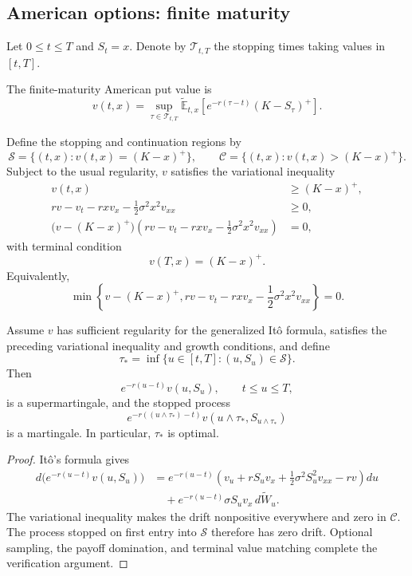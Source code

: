 \subsection{American options: finite maturity}

Let $0\leq t\leq T$ and $S_t=x$. Denote by $\mathcal{T}_{t,T}$ the stopping times taking values in $[t,T]$.

\begin{de}
The finite-maturity American put value is
\[
v(t,x)
=\sup_{\tau\in\mathcal{T}_{t,T}}
 \widetilde{\mathbb{E}}_{t,x}
 \left[e^{-r(\tau-t)}(K-S_\tau)^+\right].
\]
\end{de}

Define the stopping and continuation regions by
\[
\mathcal{S}
=\{(t,x):v(t,x)=(K-x)^+\},
\qquad
\mathcal{C}
=\{(t,x):v(t,x)>(K-x)^+\}.
\]
Subject to the usual regularity, $v$ satisfies the variational inequality
\[
\begin{aligned}
v(t,x)&\geq(K-x)^+,\\
rv-v_t-rxv_x-\frac12\sigma^2x^2v_{xx}&\geq0,\\
\bigl(v-(K-x)^+\bigr)
\left(rv-v_t-rxv_x-\frac12\sigma^2x^2v_{xx}\right)&=0,
\end{aligned}
\]
with terminal condition
\[
v(T,x)=(K-x)^+.
\]
Equivalently,
\[
\min\!\left\{
 v-(K-x)^+,
 rv-v_t-rxv_x-\frac12\sigma^2x^2v_{xx}
\right\}=0.
\]

\begin{thm}
Assume $v$ has sufficient regularity for the generalized It\^o formula, satisfies the preceding variational inequality and growth conditions, and define
\[
\tau_*
=\inf\{u\in[t,T]:(u,S_u)\in\mathcal{S}\}.
\]
Then
\[
e^{-r(u-t)}v(u,S_u),
\qquad t\leq u\leq T,
\]
is a supermartingale, and the stopped process
\[
e^{-r((u\wedge\tau_*)-t)}
 v(u\wedge\tau_*,S_{u\wedge\tau_*})
\]
is a martingale. In particular, $\tau_*$ is optimal.
\end{thm}

\begin{proof}
It\^o's formula gives
\[
\begin{aligned}
d\bigl(e^{-r(u-t)}v(u,S_u)\bigr)
&=e^{-r(u-t)}
 \left(v_u+rS_uv_x+\frac12\sigma^2S_u^2v_{xx}-rv\right)du\\
&\quad+e^{-r(u-t)}\sigma S_uv_x\,d\widetilde W_u.
\end{aligned}
\]
The variational inequality makes the drift nonpositive everywhere and zero in $\mathcal{C}$. The process stopped on first entry into $\mathcal{S}$ therefore has zero drift. Optional sampling, the payoff domination, and terminal value matching complete the verification argument.
\end{proof}

